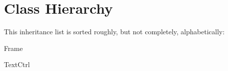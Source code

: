 \section{Class Hierarchy}
This inheritance list is sorted roughly, but not completely, alphabetically\+:\begin{DoxyCompactList}
\item Frame\begin{DoxyCompactList}
\item {}
\end{DoxyCompactList}
\item Text\+Ctrl\begin{DoxyCompactList}
\item {}
\end{DoxyCompactList}
\end{DoxyCompactList}
